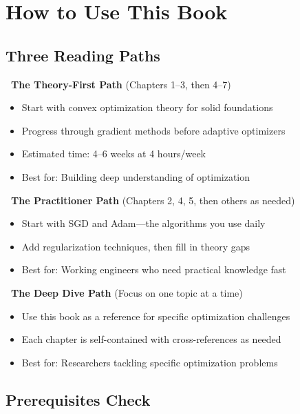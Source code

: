 \documentclass[../main.tex]{subfiles}
\begin{document}
\chapter*{How to Use This Book}
\thispagestyle{empty}

\section*{Three Reading Paths}

\textbf{{\large\textcolor{primaryblue}{\faGraduationCap}}\ The Theory-First Path} (Chapters 1--3, then 4--7)
\begin{itemize}[itemsep=0.3em]
    \item Start with convex optimization theory for solid foundations
    \item Progress through gradient methods before adaptive optimizers
    \item Estimated time: 4--6 weeks at 4 hours/week
    \item Best for: Building deep understanding of optimization
\end{itemize}

\vspace{0.4cm}

\textbf{{\large\textcolor{primaryblue}{\faCode}}\ The Practitioner Path} (Chapters 2, 4, 5, then others as needed)
\begin{itemize}[itemsep=0.3em]
    \item Start with SGD and Adam---the algorithms you use daily
    \item Add regularization techniques, then fill in theory gaps
    \item Best for: Working engineers who need practical knowledge fast
\end{itemize}

\vspace{0.4cm}

\textbf{{\large\textcolor{primaryblue}{\faBook}}\ The Deep Dive Path} (Focus on one topic at a time)
\begin{itemize}[itemsep=0.3em]
    \item Use this book as a reference for specific optimization challenges
    \item Each chapter is self-contained with cross-references as needed
    \item Best for: Researchers tackling specific optimization problems
\end{itemize}

\section*{Prerequisites Check}
\end{document}
